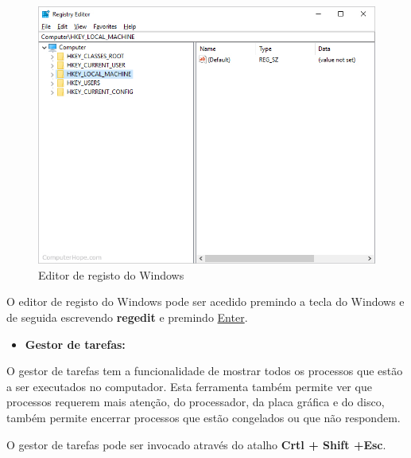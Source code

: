 \documentclass{report}
\begin{document}
\begin{figure}[h!]
\includegraphics[width=1\textwidth]{registry-editor.jpg}
\centering
\caption{Editor de registo do Windows}
\end{figure}

O editor de registo do Windows pode ser acedido premindo a tecla do Windows e de seguida escrevendo \textbf{regedit} e premindo \underline{Enter}.

\begin{itemize}
    \item \textbf{Gestor de tarefas:}
\end{itemize}

O gestor de tarefas tem a funcionalidade de mostrar todos os processos que estão a ser executados no computador. Esta ferramenta também permite ver que processos requerem mais atenção, do processador, da placa gráfica e do disco, também permite encerrar processos que estão congelados ou que não respondem.

\vspace{35mm}

O gestor de tarefas pode ser invocado através do atalho \textbf{Crtl + Shift +Esc}.

\vspace{10mm}
\end{document}
